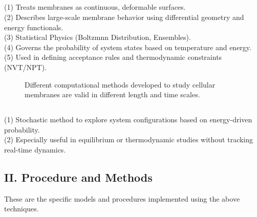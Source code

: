 \documentclass[12pt]{article}
\begin{document}
\begin{flushleft}
\subsection* {}
\begin{tabbing}
 \indent \indent    (1) Treats membranes as continuous, deformable surfaces.\\

 \indent  \indent   (2) Describes large-scale membrane behavior using differential geometry and energy functionals.\\

\indent  \indent (3) Statistical Physics (Boltzmnn Distribution, Ensembles).\\

 \indent  \indent    (4) Governs the probability of system states based on temperature and energy.\\

  \indent \indent  (5)   Used in defining acceptance rules and thermodynamic constraints (NVT/NPT).
\end{tabbing}


\begin{figure}[!ht]
  \centering
  \caption{Different computational methods developed to study cellular membranes are valid in different length and time scales.\cite{chabanon2017systems}}
\end{figure}


\subsection*{}
\begin{tabbing}

  \indent\indent    (1) Stochastic method to explore system configurations based on energy-driven probability.\\

    \indent\indent (2) Especially useful in equilibrium or thermodynamic studies without tracking real-time dynamics.
\end{tabbing}



\subsection*{II. Procedure and Methods} 


These are the specific models and procedures implemented using the above techniques.\\



\end{flushleft}
\end{document}
